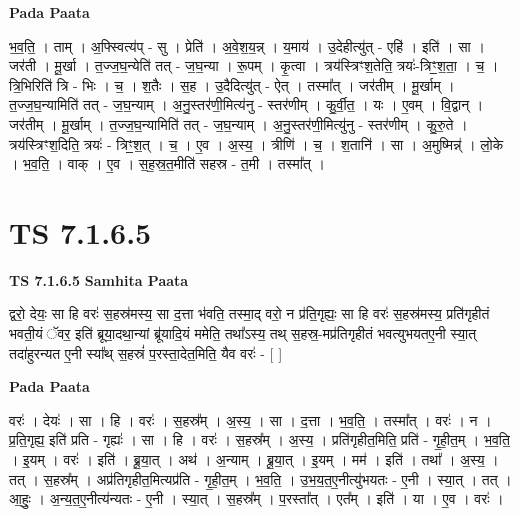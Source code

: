 \documentclass[17pt]{extarticle}
\begin{document}
\textbf{Pada Paata} \newline

भ॒व॒ति॒ । ताम् । अ॒फ्स्वित्य॑प् - सु । प्रेति॑ । अ॒वे॒श॒य॒न्न् । य॒माय॑ । उ॒देहीत्यु॑त् - एहि॑ । इति॑ । सा । जर॑ती । मू॒र्खा । त॒ज्ज॒घ॒न्येति॑ तत् - ज॒घ॒न्या । रू॒पम् । कृ॒त्वा । त्रय॑स्त्रिꣳश॒तेति॒ त्रयः॑-त्रिꣳ॒॒श॒ता॒ । च॒ । त्रि॒भिरिति॑ त्रि - भिः । च॒ । श॒तैः । स॒ह । उ॒दैदित्यु॑त् - ऐत् । तस्मा᳚त् । जर॑तीम् । मू॒र्खाम् । त॒ज्ज॒घ॒न्यामिति॑ तत् - ज॒घ॒न्याम् । अ॒नु॒स्तर॑णी॒मित्य॑नु - स्तर॑णीम् । कु॒र्वी॒त॒ । यः । ए॒वम् । वि॒द्वान् । जर॑तीम् । मू॒र्खाम् । त॒ज्ज॒घ॒न्यामिति॑ तत् - ज॒घ॒न्याम् । अ॒नु॒स्तर॑णी॒मित्यु॑नु - स्तर॑णीम् । कु॒रु॒ते । त्रय॑स्त्रिꣳश॒दिति॒ त्रयः॑ - त्रिꣳ॒॒श॒त् । च॒ । ए॒व । अ॒स्य॒ । त्रीणि॑ । च॒ । श॒तानि॑ । सा । अ॒मुष्मिन्न्॑ । लो॒के । भ॒व॒ति॒ । वाक् । ए॒व । स॒ह॒स्र॒त॒मीति॑ सहस्र - त॒मी । तस्मा᳚त् ।  \newline




\section*{ TS 7.1.6.5 }

\textbf{TS 7.1.6.5 } \newline
\textbf{Samhita Paata} \newline

द्वरो॒ देयः॒ सा हि वरः॑ स॒हस्र॑मस्य॒ सा द॒त्ता भ॑वति॒ तस्मा॒द् वरो॒ न प्र॑ति॒गृह्यः॒ सा हि वरः॑ स॒हस्र॑मस्य॒ प्रति॑गृहीतं भवती॒यं ॅवर॒ इति॑ ब्रूया॒दथा॒न्यां ब्रू॑यादि॒यं ममेति॒ तथा᳚ऽस्य॒ तथ् स॒हस्र॒-मप्र॑तिगृहीतं भवत्युभयतए॒नी स्या॒त् तदा॑हुरन्यत ए॒नी स्या᳚थ् स॒हस्रं॑ प॒रस्ता॒देत॒मिति॒ यैव वरः॑ - [  ] \newline

\textbf{Pada Paata} \newline

वरः॑ । देयः॑ । सा । हि । वरः॑ । स॒हस्र᳚म् । अ॒स्य॒ । सा । द॒त्ता । भ॒व॒ति॒ । तस्मा᳚त् । वरः॑ । न । प्र॒ति॒गृह्य॒ इति॑ प्रति - गृह्यः॑ । सा । हि । वरः॑ । स॒हस्र᳚म् । अ॒स्य॒ । प्रति॑गृहीत॒मिति॒ प्रति॑ - गृ॒ही॒त॒म् । भ॒व॒ति॒ । इ॒यम् । वरः॑ । इति॑ । ब्रू॒या॒त् । अथ॑ । अ॒न्याम् । ब्रू॒या॒त् । इ॒यम् । मम॑ । इति॑ । तथा᳚ । अ॒स्य॒ । तत् । स॒हस्र᳚म् । अप्र॑तिगृहीत॒मित्यप्र॑ति - गृ॒ही॒त॒म् । भ॒व॒ति॒ । उ॒भ॒य॒त॒ए॒नीत्यु॑भयतः - ए॒नी । स्या॒त् । तत् । आ॒हुः॒ । अ॒न्य॒त॒ए॒नीत्य॑न्यतः - ए॒नी । स्या॒त् । स॒हस्र᳚म् । प॒रस्ता᳚त् । एत᳚म् । इति॑ । या । ए॒व । वरः॑ ।  \newline
\end{document}
